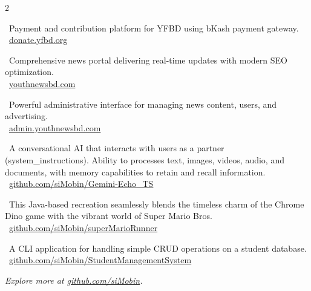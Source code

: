 \documentclass[10pt,a4paper,ragged2e,withhyper]{files/altacv}
\begin{document}
\begin{paracol}{2}
    \switchcolumn

    \small \faChevronRight \ Payment and contribution platform for YFBD using bKash payment gateway. \\[0.5em]
    \small \faGlobe \ \href{https://donate.yfbd.org/}{donate.yfbd.org}

    \divider

    \small \faChevronRight \ Comprehensive news portal delivering real-time updates with modern SEO optimization. \\[0.5em]
    \small \faGlobe \ \href{https://youthnewsbd.com}{youthnewsbd.com}

    \divider

    \small \faChevronRight \ Powerful administrative interface for managing news content, users, and advertising. \\[0.5em]
    \small \faGlobe \ \href{https://admin.youthnewsbd.com}{admin.youthnewsbd.com}

    \divider

    \small \faChevronRight \ A conversational AI that interacts with users as a \faVenus partner (system\_instructions). Ability to processes text, images, videos, audio, and documents, with memory capabilities to retain and recall information. \\[0.5em]
    \small \faGithub \ \href{https://github.com/siMobin/Gemini-Echo\_TS}{github.com/siMobin/Gemini-Echo\_TS}

    \divider

    \small \faChevronRight \ This Java-based recreation seamlessly blends the timeless charm of the Chrome Dino game with the vibrant world of Super Mario Bros. \\[0.5em]
    \small \faGithub \ \href{https://github.com/siMobin/superMarioRunner}{github.com/siMobin/superMarioRunner}

    \divider

    \small \faChevronRight \ A CLI application for handling simple CRUD operations on a student database. \\[0.5em]
    \small \faGithub \ \href{https://github.com/siMobin/StudentManagementSystem}{github.com/siMobin/StudentManagementSystem}

\end{paracol}

\vspace{4mm}
\centering \faFire \textit{Explore more at \href{https://github.com/siMobin/}{github.com/siMobin}.}\faFire
\end{document}
